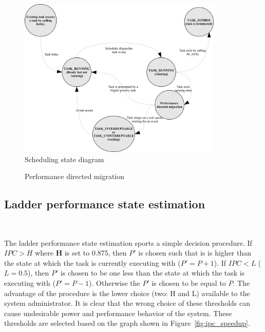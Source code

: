 \begin{figure}[h!]
  \begin{center}
    \includegraphics[height=3in]{figures/Mod_Linux_Sched.jpg}%
    \caption{Scheduling state diagram}
    \label{fig:pds_method}
  \end{center}
\end{figure}

\begin{figure}[h!]
  \begin{center}
    \caption{Performance directed migration}
    \label{fig:pds_migration}
  \end{center}
\end{figure}


\subsection{Ladder performance state estimation}~\label{sec:ladder}

The ladder performance state estimation sports a simple decision procedure. If $IPC > H$ 
where \textbf{H} is set to 0.875, then $P'$ is chosen such that is is higher than the state
at which the task is currently executing with ($P' = P + 1$). If $IPC < L$ ($L = 0.5$), then 
$P'$ is chosen to be one less than the state at which the task is executing with ($P' = P - 1$). 
Otherwise the $P'$ is chosen to be equal to $P$. The advantage of the procedure is the lower
choice (two: H and L) available to the system administrator. It is clear that the wrong choice of these
thresholds can cause undesirable power and performance behavior of the system. These thresholds are
selected based on the graph shown in Figure~\ref{fig:ipc_speedup}. 

